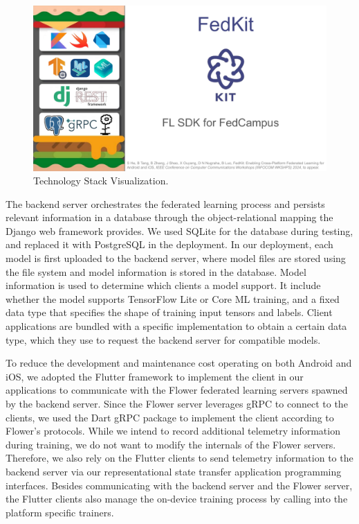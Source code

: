 \begin{figure}\begin{center}
        \includegraphics[width=0.4\linewidth]{stack_visualization.pdf}
        \caption{\fedkit Technology Stack Visualization.}
        \label{fig:stack-viz}
    \end{center}\end{figure}

The backend server orchestrates the federated learning process and persists
relevant information in a database through the object-relational mapping the
Django web framework provides. We used SQLite for the database during testing,
and replaced it with PostgreSQL in the deployment. In our deployment,
each model is first uploaded to the backend server,
where model files are stored using the file system and model information is
stored in the database.
Model information is used to determine which clients a model support.
It include whether the model supports TensorFlow Lite or Core ML training,
and a fixed data type that specifies the shape of training input tensors and
labels.
Client applications are bundled with a specific implementation to obtain a
certain data type,
which they use to request the backend server for compatible models.

To reduce the development and maintenance cost operating on both Android and
iOS,
we adopted the Flutter framework to implement the client in our applications to
communicate with the Flower federated learning servers spawned by the backend
server. Since the Flower server leverages gRPC to connect to the clients,
we used the Dart gRPC package to implement the client according to Flower's
protocols.
While we intend to record additional telemetry information during training,
we do not want to modify the internals of the Flower servers. Therefore,
we also rely on the Flutter clients to send telemetry information to the backend
server via our representational state transfer application programming
interfaces.
Besides communicating with the backend server and the Flower server,
the Flutter clients also manage the on-device training process by calling into
the platform specific trainers. %

